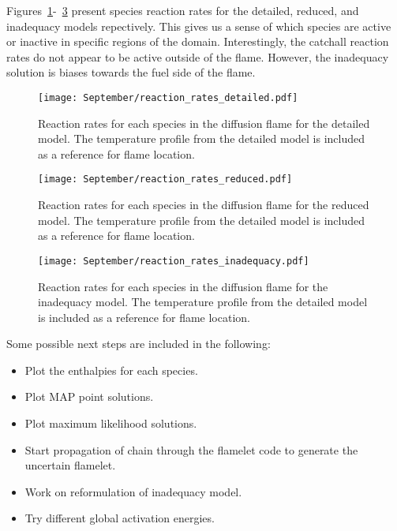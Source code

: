 Figures~\ref{fig:reaction_rates_detailed}-~\ref{fig:reaction_rates_inadequacy} 
present species reaction rates for the detailed, reduced, and inadequacy 
models repectively.  This gives us a sense of which species are active or 
inactive in specific regions of the domain.  Interestingly, the catchall 
reaction rates do not appear to be active outside of the flame.  However, 
the inadequacy solution is biases towards the fuel side of the flame.
\begin{figure}[ht!]
  \texttt{[image: September/reaction\_rates\_detailed.pdf]}
  \caption{Reaction rates for each species in the diffusion flame for the
           detailed model.  The temperature profile from the detailed 
           model is included as a reference for flame location.}
  \label{fig:reaction_rates_detailed}
\end{figure}

\begin{figure}[ht!]
  \texttt{[image: September/reaction\_rates\_reduced.pdf]}
  \caption{Reaction rates for each species in the diffusion flame for the
           reduced model.  The temperature profile from the detailed 
           model is included as a reference for flame location.}
  \label{fig:reaction_rates_reduced}
\end{figure}

\begin{figure}[ht!]
  \texttt{[image: September/reaction\_rates\_inadequacy.pdf]}
  \caption{Reaction rates for each species in the diffusion flame for the
           inadequacy model.  The temperature profile from the detailed 
           model is included as a reference for flame location.}
  \label{fig:reaction_rates_inadequacy}
\end{figure}

Some possible next steps are included in the following:
\begin{itemize}
  \item Plot the enthalpies for each species.
  \item Plot MAP point solutions.
  \item Plot maximum likelihood solutions.
  \item Start propagation of chain through the flamelet code
        to generate the uncertain flamelet.
  \item Work on reformulation of inadequacy model.
  \item Try different global activation energies.
\end{itemize}























